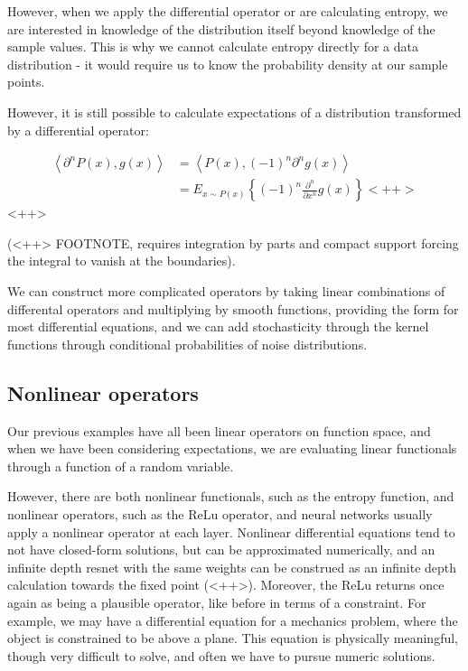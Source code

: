 \documentclass[a4paper]{article}
\begin{document}
However, when we apply the differential operator or are calculating entropy, we are interested in knowledge of the distribution itself beyond knowledge of the sample values. 
This is why we cannot calculate entropy directly for a data distribution - it would require us to know the probability density at our sample points. 

However, it is still possible to calculate expectations of a distribution transformed by a differential operator:

\begin{equation}
  \begin{split}
    \left< \partial^n P(x), g(x) \right> &= \left< P(x), (-1)^{n} \partial^n g(x) \right> \\
    &= E_{ x \sim P(x)} \left\{ (-1)^n \frac{\partial^n}{\partial x^n} g(x) \right\}<++>
  \end{split}
  \label{<++>}
\end{equation}<++>

(<++> FOOTNOTE, requires integration by parts and compact support forcing the integral to vanish at the boundaries). 

We can construct more complicated operators by taking linear combinations of differental operators and multiplying by smooth functions, providing the form for most differential equations, and we can add stochasticity through the kernel functions through conditional probabilities of noise distributions.

\subsection{Nonlinear operators}

Our previous examples have all been linear operators on function space, and when we have been considering expectations, we are evaluating linear functionals through a function of a random variable. 

However, there are both nonlinear functionals, such as the entropy function, and nonlinear operators, such as the ReLu operator, and neural networks usually apply a nonlinear operator at each layer. 
Nonlinear differential equations tend to not have closed-form solutions, but can be approximated numerically, and an infinite depth resnet with the same weights can be construed as an infinite depth calculation towards the fixed point (<++>). 
Moreover, the ReLu returns once again as being a plausible operator, like before in terms of a constraint. 
For example, we may have a differential equation for a mechanics problem, where the object is constrained to be above a plane. 
This equation is physically meaningful, though very difficult to solve, and often we have to pursue numeric solutions. 
\end{document}

